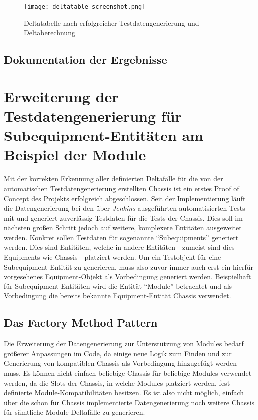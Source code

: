 \begin{figure}[h]
    \centering
    \texttt{[image: deltatable-screenshot.png]}
    \caption{Deltatabelle nach erfolgreicher Testdatengenerierung und Deltaberechnung}
\end{figure}

\subsection{Dokumentation der Ergebnisse}\label{subsec:documentationChassis}

\section{Erweiterung der Testdatengenerierung für Subequipment-Entitäten am Beispiel der Module}\label{sec:tdgmodule}
Mit der korrekten Erkennung aller definierten Deltafälle für die von der automatischen Testdatengenerierung erstellten Chassis ist ein erstes Proof of Concept des Projekts erfolgreich abgeschlossen. Seit der Implementierung läuft die Datengenerierung bei den über \textit{Jenkins} ausgeführten automatisierten Tests mit und generiert zuverlässig Testdaten für die Tests der Chassis. Dies soll im nächsten großen Schritt jedoch auf weitere, komplexere Entitäten ausgeweitet werden. Konkret sollen Testdaten für sogenannte \enquote{Subequipments} generiert werden. Dies sind Entitäten, welche in andere Entitäten - zumeist sind dies Equipments wie Chassis - platziert werden. Um ein Testobjekt für eine Subequipment-Entität zu generieren, muss also zuvor immer auch erst ein hierfür vorgesehenes Equipment-Objekt als Vorbedingung generiert werden. Beispielhaft für Subequipment-Entitäten wird die Entität \enquote{Module} betrachtet und als Vorbedingung die bereits bekannte Equipment-Entität Chassis verwendet.

\subsection{Das Factory Method Pattern}\label{subsec:factoryMethod}
Die Erweiterung der Datengenerierung zur Unterstützung von Modules bedarf größerer Anpassungen im Code, da einige neue Logik zum Finden und zur Generierung von kompatiblen Chassis als Vorbedingung hinzugefügt werden muss. Es können nicht einfach beliebige Chassis für beliebige Modules verwendet werden, da die Slots der Chassis, in welche Modules platziert werden, fest definierte Module-Kompatibilitäten besitzen. Es ist also nicht möglich, einfach über die schon für Chassis implementierte Datengenerierung noch weitere Chassis für sämtliche Module-Deltafälle zu generieren. 

